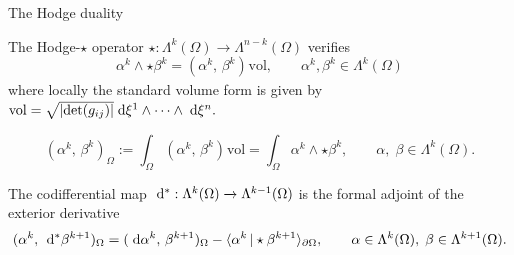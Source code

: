 \documentclass[aspectratio=169]{beamer}
\newcommand{\inpr}[3][]{\ensuremath{( #2, \, #3 )_{#1}}}
\newcommand{\dualpr}[3][]{\ensuremath{\langle #2 \, \vert #3 \rangle_{#1}}}
\begin{document}
\begin{frame}{The Hodge duality}
	
	
	\begin{definition}
		The Hodge-$\star$ operator $\star : \Lambda^k(\Omega) \rightarrow \Lambda^{n-k}(\Omega)$ verifies 
		\begin{equation*}
			\alpha^k \wedge \star \beta^k = \inpr{\alpha^k}{\beta^k} \mathrm{vol}, \qquad \alpha^k, \beta^k \in \Lambda^k(\Omega)
		\end{equation*}
		where locally the standard volume form is given by $\mathrm{vol} = \sqrt{|\mathrm{det}(g_{ij})|}\d\xi^1 \wedge \dots \wedge \d\xi^n.$	
\end{definition}

\begin{definition}
	\begin{equation*}
		\inpr[\Omega]{\alpha^k}{\beta^k} := \int_\Omega \inpr{\alpha^k}{\beta^k} \mathrm{vol} = \int_\Omega \alpha^k \wedge \star \beta^k, \qquad \alpha, \; \beta \in \Lambda^{k}(\Omega).
	\end{equation*}
\end{definition}

\begin{definition}[Codifferential]
	The codifferential  map $\d{}^{*} : \Lambda^k(\Omega) \xrightarrow{} \Lambda^{k-1}(\Omega)$ is the formal  adjoint of the exterior derivative
	\begin{equation*}
		\inpr[\Omega]{\alpha^k}{\d{}^* \beta^{k+1}} = \inpr[\Omega]{\d \alpha^{k}}{\beta^{k+1}} - \dualpr[\partial \Omega]{\alpha^{k}}{\star \beta^{k+1}}, \qquad \alpha \in \Lambda^k(\Omega), \; \beta \in \Lambda^{k+1}(\Omega).
	\end{equation*}
\end{definition}


\end{frame}
\end{document}
